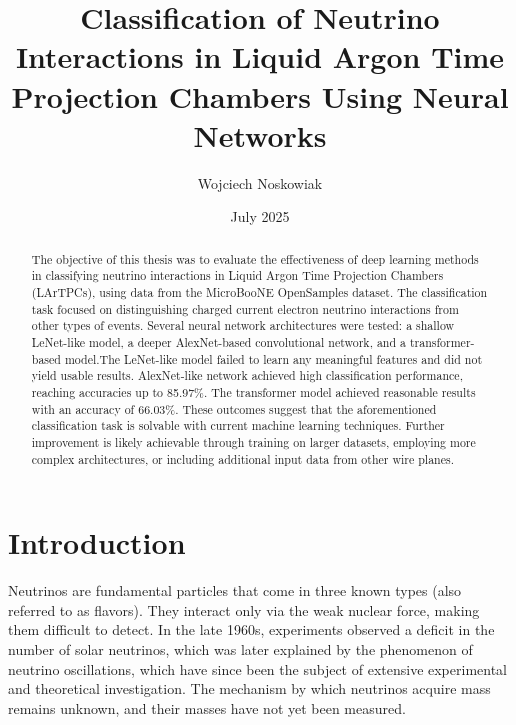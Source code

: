 \documentclass{pracalicmgr}
\author{Wojciech Noskowiak}
\title{Classification of Neutrino Interactions in Liquid Argon Time Projection Chambers Using Neural Networks}
\date{July 2025}
\begin{document}
\setlength{\textheight}{24.5cm}
\setlength{\textwidth}{16cm}
\setlength{\topmargin}{-0.5cm}
\setlength{\headheight}{0cm}
\setlength{\oddsidemargin}{0.5cm}
\setlength{\evensidemargin}{-0.5cm}

\maketitle
\let\cleardoublepage\clearpage

\begin{abstract}
The objective of this thesis was to evaluate the effectiveness of deep learning methods in classifying neutrino interactions in Liquid Argon Time Projection Chambers (LArTPCs), using data from the MicroBooNE OpenSamples dataset. The classification task focused on distinguishing charged current electron neutrino interactions from other types of events. Several neural network architectures were tested: a shallow LeNet-like model, a deeper AlexNet-based convolutional network, and a transformer-based model.The LeNet-like model failed to learn any meaningful features and did not yield usable results. AlexNet-like network achieved high classification performance, reaching accuracies up to 85.97\%. The transformer model achieved reasonable results with an accuracy of 66.03\%. These outcomes suggest that the aforementioned classification task is solvable with current machine learning techniques. Further improvement is likely achievable through training on larger datasets, employing more complex architectures, or including additional input data from other wire planes.

\end{abstract}

\tableofcontents

\chapter*{Introduction}

Neutrinos are fundamental particles that come in three known types (also referred to as flavors). They interact only via the weak nuclear force, making them difficult to detect. In the late 1960s, experiments observed a deficit in the number of solar neutrinos, which was later explained by the phenomenon of neutrino oscillations, which have since been the subject of extensive experimental and theoretical investigation\cite{NeutrionoOscillationsHistory}. The mechanism by which neutrinos acquire mass remains unknown, and their masses have not yet been measured.
\end{document}

